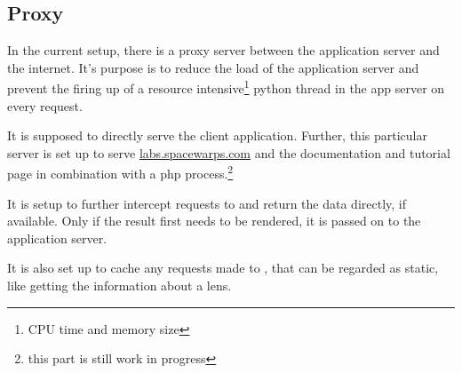 \subsection{Proxy}
\label{sec:proxy}

In the current setup, there is a proxy server between the application server and the internet.
It's purpose is to reduce the load of the application server and prevent the firing up of a resource intensive\footnote{CPU time and memory size} python thread in the app server on every request.

It is supposed to directly serve the client application. Further, this particular server is set up to serve \url{labs.spacewarps.com} and the \spl documentation and tutorial page in combination with a php process.\footnote{this part is still work in progress}

It is setup to further intercept requests to  and return the data directly, if available.
Only if the result first needs to be rendered, it is passed on to the application server.

It is also set up to cache any requests made to , that can be regarded as static, like getting the information about a lens.

